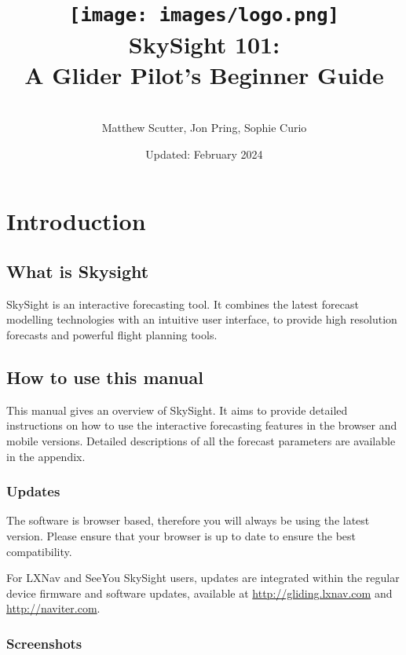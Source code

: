 \documentclass[11pt,a4paper]{article}
\title{\texttt{[image: images/logo.png]}\\[1cm]SkySight 101: \\[0.5cm]A Glider Pilot's Beginner Guide}
\author{\\Matthew Scutter, Jon Pring, Sophie Curio}
\date{Updated: February 2024}
\begin{document}
\begin{titlepage}
\maketitle
\end{titlepage}

\tableofcontents
\pagebreak

\section{Introduction}
\subsection{What is Skysight}

SkySight is an interactive forecasting tool. It combines the latest forecast modelling technologies with an intuitive user interface, to provide high resolution forecasts and powerful flight planning tools.




\subsection{How to use this manual}

This manual gives an overview of SkySight. It aims to provide detailed instructions on how to use the interactive forecasting features in the browser and mobile versions. Detailed descriptions of all the forecast parameters are available in the appendix.



\subsubsection{Updates}

The software is browser based, therefore you will always be using the latest version. Please ensure that your browser is up to date to ensure the best compatibility.

For LXNav and SeeYou SkySight users, updates are integrated within the regular device firmware and software updates, available at \url{http://gliding.lxnav.com} and \url{http://naviter.com}.

\subsubsection{Screenshots}
\end{document}
